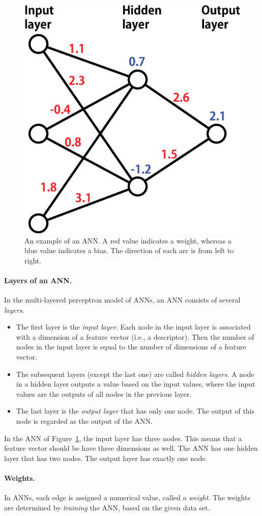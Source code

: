 \documentclass[11pt,titlepage,dvipdfmx,twoside]{book}
\newcommand{\figref}[1]{Figure~\ref{fig:#1}}
\begin{document}
\begin{figure}[h!]
  \centering
  \includegraphics[width = 0.4 \textwidth]{./fig/ANN_sample_en}
  \caption{An example of an ANN.
    A red value indicates a weight, whereas
    a blue value indicates a bias.
    The direction of each arc is from left to right.}
  \label{fig:sample}
\end{figure}

\paragraph{Layers of an ANN.}
In the multi-layered perceptron model of ANNs,
an ANN consists of several \emph{layers}.
%
\begin{itemize}
  \item 
  The first layer is the {\em input layer}.
    Each node in the input layer is associated with a dimension of
    a feature vector (i.e., a descriptor). 
    Then the number of nodes in the input layer
    is equal to the number of dimensions of a feature vector. 
    
  \item 
  The subsequent layers (except the last one) are called
    {\em hidden layers}. A node in a hidden layer outputs a value
    based on the input values, where the input values
    are the outputs of all nodes in the previous layer.
    
  \item 
  The last layer is the {\em output layer} that has only one node.
    The output of this node is regarded as the output of the ANN. 
\end{itemize}

In the ANN of \figref{sample}, the input layer has three nodes.
This means that a feature vector should be have three dimensions as well.
The ANN has one hidden layer that has two nodes.
The output layer has exactly one node. 

\paragraph{Weights.}
In ANNs, each edge is assigned a numerical value, called a {\em weight}.
The weights are determined by \emph{training} the ANN, 
based on the given data set. 
\end{document}
